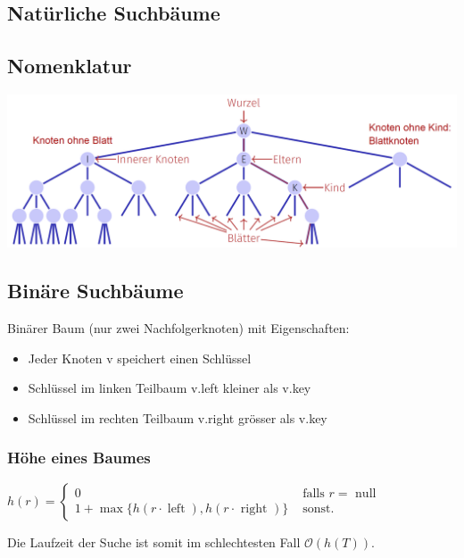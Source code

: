 \vspace{-4pt}
\begin{sectionbox}
\section{Natürliche Suchbäume}
\subsection{Nomenklatur}
\begin{center}
    \includegraphics[width = \columnwidth]{../img/BaumNomen.png}
\end{center}
\end{sectionbox}
\vspace{-4pt}
\begin{sectionbox}
  \subsection{Binäre Suchbäume}\smallskip
  Binärer Baum (nur zwei Nachfolgerknoten) mit Eigenschaften:\par
  \begin{itemize}
      \item Jeder Knoten v speichert einen Schlüssel
      \item Schlüssel im linken Teilbaum v.left kleiner als v.key
      \item Schlüssel im rechten Teilbaum v.right grösser als v.key
  \end{itemize}
  
  \subsubsection{Höhe eines Baumes}\smallskip
  $h(r)=\left\{\begin{array}{ll}0 & \text { falls } r=\text { null } \\ 1+\max \{h(r \cdot \operatorname{left}), h(r \cdot \text { right })\} & \text { sonst. }\end{array}\right.$\par\smallskip
  Die Laufzeit der Suche ist somit im schlechtesten Fall $\mathcal{O}(h(T))$.\par\smallskip
  \end{sectionbox}

